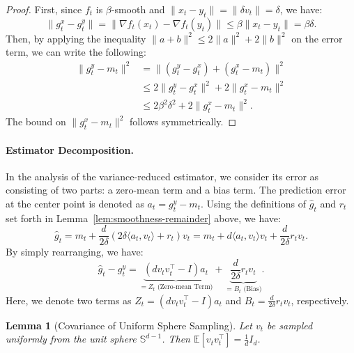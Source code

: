 \documentclass[journal,onecolumn]{IEEEtran}
\theoremstyle{plain}
\newtheorem{lemma}[theorem]{Lemma}
\theoremstyle{definition}
\theoremstyle{remark}
\begin{document}
{\begin{proof}
    First, since $f_{t}$ is $\beta$-smooth and
    $\|x_{t}- y_{t}\| = \|\delta v_{t}\| = \delta$, we have:
    \begin{equation*}
        \|g_{t}^{x}- g_{t}^{y}\| = \|\nabla f_{t}(x_{t}) - \nabla f_{t}(y_{t})\|
        \le \beta\|x_{t}- y_{t}\| = \beta\delta.
    \end{equation*}
    Then, by applying the inequality $\|a+b\|^{2}\le 2\|a\|^{2}+ 2\|b\|^{2}$ on the error term, we can write the following:
    \begin{align*}
        \|g_{t}^{y}- m_{t}\|^{2} & = \|(g_{t}^{y}- g_{t}^{x}) + (g_{t}^{x}- m_{t})\|^{2}        \\
        & \le 2\|g_{t}^{y}- g_{t}^{x}\|^{2}+ 2\|g_{t}^{x}- m_{t}\|^{2} \\
        & \le 2\beta^{2}\delta^{2}+ 2\|g_{t}^{x}- m_{t}\|^{2}.
    \end{align*}
    The bound on $\|g_{t}^{x}- m_{t}\|^{2}$ follows symmetrically.
\end{proof}

\paragraph{Estimator Decomposition.}
In the analysis of the variance-reduced estimator, we consider its error as consisting of two parts: a zero-mean term and a bias term. The prediction error at the center point is denoted as $a_{t}= g_{t}^{y}- m_{t}$. Using the definitions of $\hat{g}_{t}$ and $r_{t}$ set forth in Lemma~\ref{lem:smoothness-remainder} above, we have:
\begin{equation}
    \hat g_{t}=m_{t}+ \frac{d}{2\delta}\left( 2\delta \langle a_{t}, v_{t}\rangle
    + r_{t}\right) v_{t}=m_{t}+ d\langle a_{t},v_{t}\rangle v_{t}+ \frac{d}{2\delta}
    r_{t}v_{t}. \label{eq:estimator-expanded}
\end{equation}
By simply rearranging, we have:
\begin{equation*}
    \hat g_{t}- g_{t}^{y}= \underbrace{(d v_tv_t^\top - I)a_t}_{= Z_t
    \text{ (Zero-mean Term)}}+ \underbrace{\frac{d}{2\delta}r_t v_t}_{= B_t
    \text{ (Bias)}}. \label{eq:ZB}
\end{equation*}
Here, we denote two terms as $Z_{t} = (dv_{t}v_{t}^{\top}-I)a_{t}$ and $B_{t}=\frac{d}{2\delta}r_{t}v_{t}$, respectively.

\begin{lemma}[Covariance of Uniform Sphere Sampling]
    \label{lem:sphere-covariance} Let $v_{t}$ be sampled uniformly from the unit
    sphere $\mathbb{S}^{d-1}$. Then
    $\mathbb{E}[v_{t}v_{t}^{\top}] = \frac{1}{d}I_{d}$.
\end{lemma}

}
\end{document}
